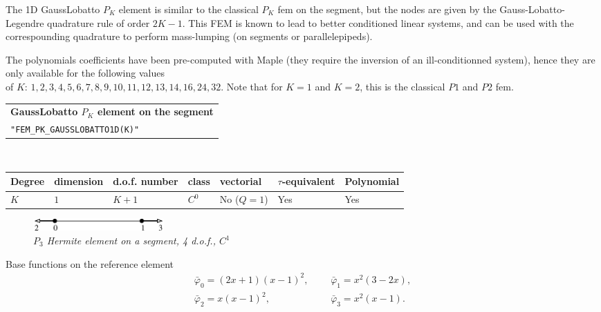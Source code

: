 \documentclass[11pt,a4paper]{article}
\begin{document}
The 1D GaussLobatto $P_K$ element is similar to the classical $P_K$ fem on the segment, but
the nodes are given by the Gauss-Lobatto-Legendre quadrature rule of
order $2K-1$. This FEM is known to lead to better conditioned linear
systems, and can be used with the correspounding quadrature to perform
mass-lumping (on segments or parallelepipeds).

The polynomials coefficients have been pre-computed with Maple (they require the inversion of an ill-conditionned system), hence they are only available for the following values \\ of $K$: $1, 2, 3, 4, 5, 6, 7, 8, 9, 10, 11, 12, 13, 14, 16, 24, 32$. Note that for $K=1$ and $K=2$, this is the classical $P1$ and $P2$ fem.

\begin{center}
\begin{tabular}{|m{16.11cm}|} \hline 
{\bf GaussLobatto $P_K$ element on the segment}\\
{\tt "FEM\_PK\_GAUSSLOBATTO1D(K)"}
\end{tabular} \\ \vspace{-1pt} 
\begin{tabular}{|m{2cm}|m{2cm}|m{2.5cm}|m{1.2cm}|m{2cm}|m{2cm}|m{1.8cm}|} \hline 
Degree & dimension & d.o.f. number & class & vectorial & \mbox{$\tau$-equivalent} & Polynomial\\ \hline
$K$ & $1$ & $K+1$ & $C^0$ & No \mbox{($Q = 1$)} & Yes & Yes\\ \hline
\end{tabular}
\end{center}

\begin{figure}[H]
  \begin{center}
    \includegraphics[width=5cm,angle=0]{getfemlist_segment_hermite.eps}
  \end{center}
  \caption{ \it $P_3$ Hermite element on a segment, 4 d.o.f., $C^1$} 
  \label{fig:segment_hermite}
\end{figure}

Base functions on the reference element
\begin{eqnarray*}
 \bar{\varphi}_0 = (2x+1)(x-1)^2,&&\ \ \ \bar{\varphi}_1 = x^2(3-2x), \\
 \bar{\varphi}_2 = x(x-1)^2,&& \ \ \ \bar{\varphi}_3 = x^2(x - 1). 
\end{eqnarray*}
\end{document}
